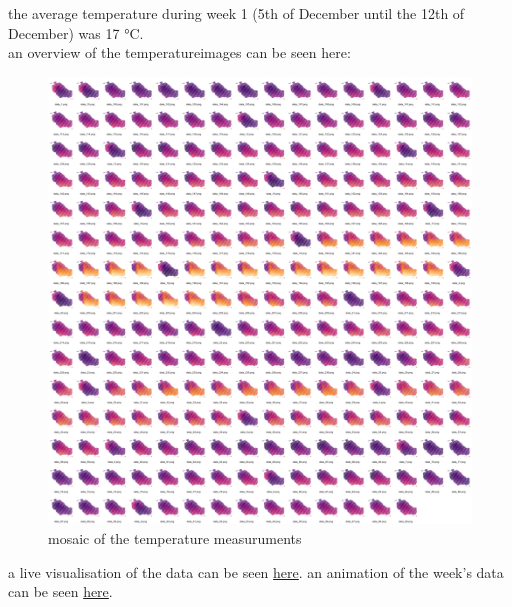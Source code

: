 \FloatBarrier 
the average temperature during week 1 (5th of December until the 12th of December) was 17 °C. \\an overview of the temperatureimages can be seen here:\begin{figure}[hbt!] 
\centering 
\includegraphics[width=\textwidth]{reports/current_report/images/montage_temperature.jpg}  
\caption{mosaic of the temperature measuruments} 
\end{figure} 
\FloatBarrier 
a live visualisation of the data can be seen \href{https://data.hasdata.xyz/}{here}. an animation of the week's data can be seen \href{https://data.hasdata.xyz/}{here}. 